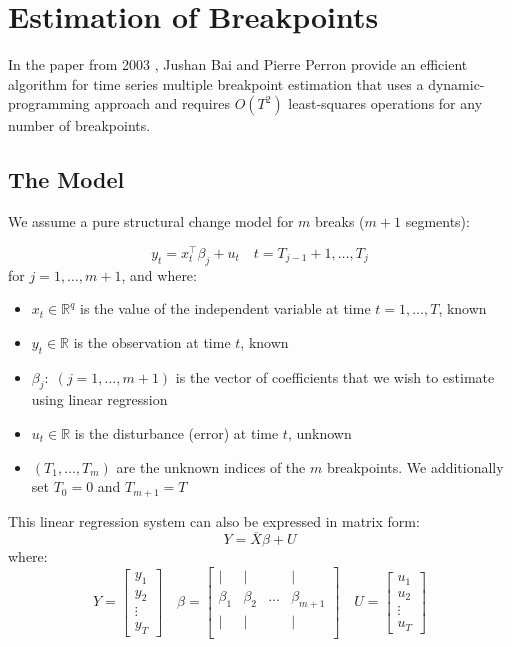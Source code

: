 \documentclass[main.tex]{subfiles}
\begin{document}
\chapter{Estimation of Breakpoints}
\label{chap:breakpoints}
In the paper from 2003 \cite{bai_perron}, Jushan Bai and Pierre Perron provide an
efficient algorithm for time series multiple breakpoint estimation that uses a
dynamic-programming approach and requires $O(T^2)$ least-squares operations for
any number of breakpoints.

\section{The Model}
\label{sec:breakpoints_the_model}
We assume a pure structural change model for $m$ breaks ($m+1$ segments):

\[
y_{t} = x_{t}^{\top} \beta_{j}+u_{t} \quad t=T_{j-1}+1, \ldots, T_{j}
\]
for $j = 1,\hdots , m+1$, and where:
\begin{itemize}
\item $x_t \in \mathbb{R}^q$ is the value of the independent variable at time
  $t = 1,\hdots , T$, known
\item $y_{t} \in \mathbb{R}$ is the observation at time $t$, known
\item $\beta_j: \; (j=1, \hdots ,m+1)$ is the vector of coefficients that
  we wish to estimate using linear regression 
\item $u_{t} \in \mathbb{R}$ is the disturbance (error) at time $t$, unknown
\item $(T_1, \hdots ,T_m)$ are the unknown indices of the $m$ breakpoints.
 We additionally set $T_0 = 0$ and $T_{m+1} = T$
\end{itemize}
This linear regression system can also be expressed in matrix form:
\[
Y = \overline{X}\beta + U
\]
where:
\[
Y =
\begin{bmatrix}
y_1 \\
y_2 \\
\vdots \\
y_T
\end{bmatrix}
\quad
\beta =
\begin{bmatrix}
\vert & \vert &  & \vert \\
\beta_{1} & \beta_{2}  & \hdots & \beta_{m+1}\\
\vert & \vert &  & \vert\\
\end{bmatrix}
\quad
U =
\begin{bmatrix}
u_1 \\
u_2 \\
\vdots \\
u_T
\end{bmatrix}
\]
\end{document}
